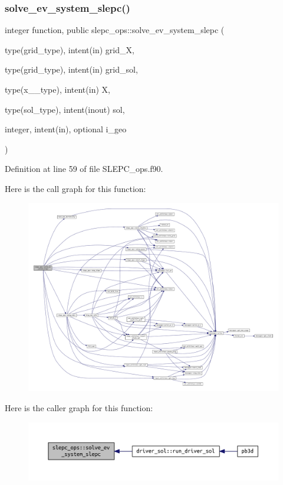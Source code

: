 \subsubsection{\texorpdfstring{solve\+\_\+ev\+\_\+system\+\_\+slepc()}{solve\_ev\_system\_slepc()}}
{\footnotesize\ttfamily integer function, public slepc\+\_\+ops\+::solve\+\_\+ev\+\_\+system\+\_\+slepc (\begin{DoxyParamCaption}\item[{type(grid\+\_\+type), intent(in)}]{grid\+\_\+X,  }\item[{type(grid\+\_\+type), intent(in)}]{grid\+\_\+sol,  }\item[{type(x\+\_\+2\+\_\+type), intent(in)}]{X,  }\item[{type(sol\+\_\+type), intent(inout)}]{sol,  }\item[{integer, intent(in), optional}]{i\+\_\+geo }\end{DoxyParamCaption})}



Definition at line 59 of file S\+L\+E\+P\+C\+\_\+ops.\+f90.

Here is the call graph for this function\+:
\nopagebreak
\begin{figure}[H]
\begin{center}
\leavevmode
\includegraphics[width=350pt]{namespaceslepc__ops_ad9d4a9b7275ac5a6b9b35e481a7c1710_cgraph}
\end{center}
\end{figure}
Here is the caller graph for this function\+:
\nopagebreak
\begin{figure}[H]
\begin{center}
\leavevmode
\includegraphics[width=350pt]{namespaceslepc__ops_ad9d4a9b7275ac5a6b9b35e481a7c1710_icgraph}
\end{center}
\end{figure}
\mbox{\label{namespaceslepc__ops_a5f69f9325197c270c7975f01360a9648}} 
